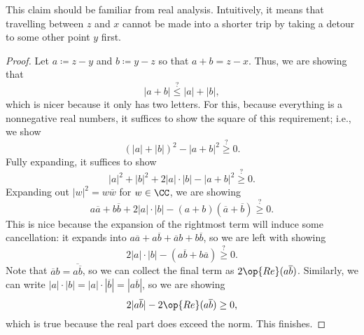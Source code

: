 \documentclass[../notes.tex]{subfiles}
\begin{document}
This claim should be familiar from real analysis. Intuitively, it means that travelling between $z$ and $x$ cannot be made into a shorter trip by taking a detour to some other point $y$ first.
\begin{proof}
	Let $a\coloneqq z-y$ and $b\coloneqq y-z$ so that $a+b=z-x$. Thus, we are showing that
	\[|a+b|\stackrel?\le|a|+|b|,\]
	which is nicer because it only has two letters. For this, because everything is a nonnegative real numbers, it suffices to show the square of this requirement; i.e., we show
	\[(|a|+|b|)^2-|a+b|^2\stackrel?\ge0.\]
	Fully expanding, it suffices to show
	\[|a|^2+|b|^2+2|a|\cdot|b|-|a+b|^2\stackrel?\ge0.\]
	Expanding out $|w|^2=w\overline w$ for $w\in\CC$, we are showing
	\[a\overline a+b\overline b+2|a|\cdot|b|-(a+b)(\overline a+\overline b)\stackrel?\ge0.\]
	This is nice because the expansion of the rightmost term will induce some cancellation: it expands into $a\overline a+a\overline b+\overline ab+b\overline b$, so we are left with showing
	\[2|a|\cdot|b|-(a\overline b+b\overline a)\stackrel?\ge0.\]
	Note that $\overline ab=\overline{a\overline b}$, so we can collect the final term as $2\op{Re}(a\overline b)$. Similarly, we can write $|a|\cdot|b|=|a|\cdot|\overline b|=|a\overline b|$, so we are showing
	\[2|a\overline b|-2\op{Re}(a\overline b)\ge0,\]
	which is true because the real part does exceed the norm. This finishes.
\end{proof}
\end{document}
